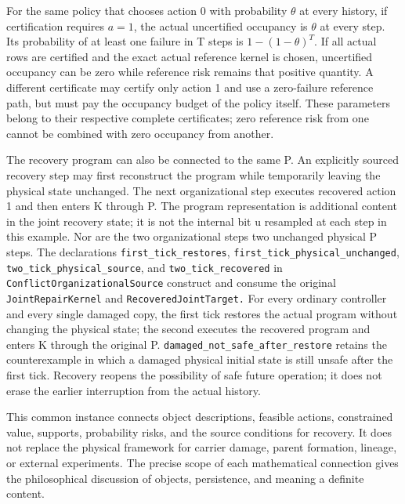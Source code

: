 \documentclass[
  english,
  11pt,
  oneside]{book}
\begin{document}
For the same policy that chooses action 0 with probability \(\theta\) at every history, if certification requires \(a=1\), the actual uncertified occupancy is \(\theta\) at every step. Its probability of at least one failure in T steps is \(1-(1-\theta)^T\). If all actual rows are certified and the exact actual reference kernel is chosen, uncertified occupancy can be zero while reference risk remains that positive quantity. A different certificate may certify only action 1 and use a zero-failure reference path, but must pay the occupancy budget of the policy itself. These parameters belong to their respective complete certificates; zero reference risk from one cannot be combined with zero occupancy from another.

The recovery program can also be connected to the same P. An explicitly sourced recovery step may first reconstruct the program while temporarily leaving the physical state unchanged. The next organizational step executes recovered action 1 and then enters K through P. The program representation is additional content in the joint recovery state; it is not the internal bit u resampled at each step in this example. Nor are the two organizational steps two unchanged physical P steps. The declarations \nolinkurl{first_tick_restores}, \nolinkurl{first_tick_physical_unchanged}, \nolinkurl{two_tick_physical_source}, and \nolinkurl{two_tick_recovered} in \nolinkurl{ConflictOrganizationalSource} construct and consume the original \nolinkurl{JointRepairKernel} and \nolinkurl{RecoveredJointTarget.} For every ordinary controller and every single damaged copy, the first tick restores the actual program without changing the physical state; the second executes the recovered program and enters K through the original P. \nolinkurl{damaged_not_safe_after_restore} retains the counterexample in which a damaged physical initial state is still unsafe after the first tick. Recovery reopens the possibility of safe future operation; it does not erase the earlier interruption from the actual history.

This common instance connects object descriptions, feasible actions, constrained value, supports, probability risks, and the source conditions for recovery. It does not replace the physical framework for carrier damage, parent formation, lineage, or external experiments. The precise scope of each mathematical connection gives the philosophical discussion of objects, persistence, and meaning a definite content.
\end{document}
